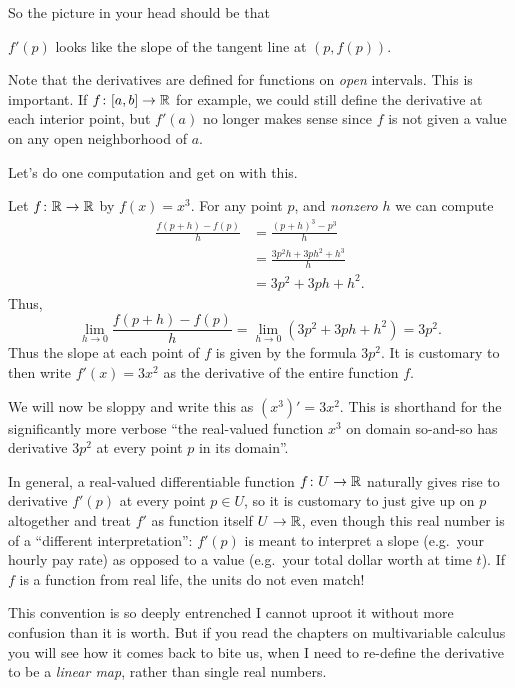 So the picture in your head should be that
\begin{moral}
	$f'(p)$ looks like the slope of the tangent line at $(p, f(p))$.
\end{moral}

\begin{remark}
	Note that the derivatives are defined
	for functions on \emph{open} intervals.
	This is important.
	If $f \colon [a,b] \to \mathbb R$ for example,
	we could still define the derivative at each interior point,
	but $f'(a)$ no longer makes sense
	since $f$ is not given a value on any open neighborhood of $a$.
\end{remark}

Let's do one computation and get on with this.
\begin{example}
	[Derivative of $x^3$ is $3x^2$]
	Let $f \colon \mathbb R \to \mathbb R$ by $f(x) = x^3$.
	For any point $p$, and \emph{nonzero} $h$ we can compute
	\begin{align*}
		\frac{f(p+h) - f(p)}{h} &= \frac{(p+h)^3 - p^3}{h} \\
		&= \frac{3p^2h + 3ph^2 + h^3}{h} \\
		&= 3p^2 + 3ph + h^2.
	\end{align*}
	Thus,
	\[ \lim_{h \to 0} \frac{f(p+h)-f(p)}{h}
		= \lim_{h \to 0} (3p^2+3ph+h^2) = 3p^2. \]
	Thus the slope at each point of $f$ is given by the formula $3p^2$.
	It is customary to then write $f'(x) = 3x^2$
	as the derivative of the entire function $f$.
\end{example}
\begin{abuse}
	We will now be sloppy and write this as $(x^3)' = 3x^2$.
	This is shorthand for the significantly more verbose
	``the real-valued function $x^3$ on domain so-and-so
	has derivative $3p^2$ at every point $p$ in its domain''.

	In general, a real-valued differentiable function
	$f \colon U \to \mathbb R$ naturally gives rise to derivative
	$f'(p)$ at every point $p \in U$,
	so it is customary to just give up on $p$ altogether
	and treat $f'$ as function itself $U \to \mathbb R$,
	even though this real number is of a ``different interpretation'':
	$f'(p)$ is meant to interpret a slope (e.g.\ your hourly pay rate)
	as opposed to a value (e.g.\ your total dollar worth at time $t$).
	If $f$ is a function from real life, the units do not even match!

	This convention is so deeply entrenched I cannot uproot it
	without more confusion than it is worth.
	But if you read the chapters on multivariable calculus
	you will see how it comes back to bite us,
	when I need to re-define the derivative to be a \emph{linear map},
	rather than single real numbers.
\end{abuse}

